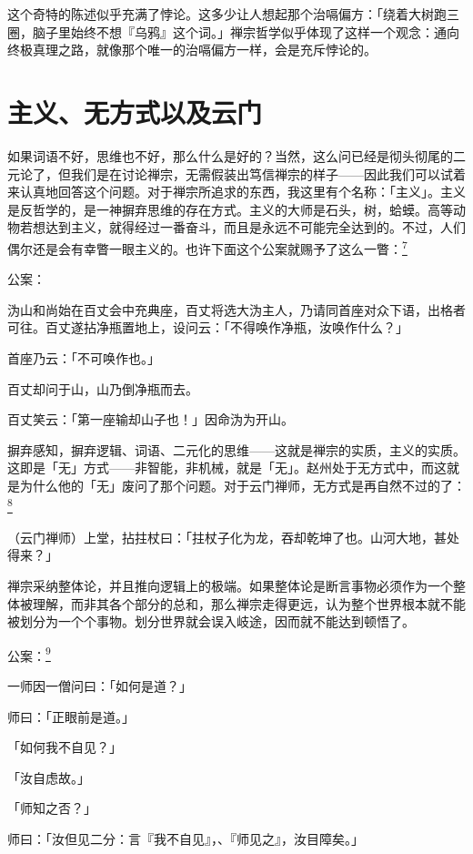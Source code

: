 \documentclass[
  12pt,
  twoside,
  openright,
  oldfontcommands,
]{memoir}
\begin{document}
这个奇特的陈述似乎充满了悖论。这多少让人想起那个治嗝偏方：「绕着大树跑三圈，脑子里始终不想『乌鸦』这个词。」禅宗哲学似乎体现了这样一个观念：通向终极真理之路，就像那个唯一的治嗝偏方一样，会是充斥悖论的。

\section{主义、无方式以及云门}

如果词语不好，思维也不好，那么什么是好的？当然，这么问已经是彻头彻尾的二元论了，但我们是在讨论禅宗，无需假装出笃信禅宗的样子------因此我们可以试着来认真地回答这个问题。对于禅宗所追求的东西，我这里有个名称：「主义」。主义是反哲学的，是一神摒弃思维的存在方式。主义的大师是石头，树，蛤蟆。高等动物若想达到主义，就得经过一番奋斗，而且是永远不可能完全达到的。不过，人们偶尔还是会有幸瞥一眼主义的。也许下面这个公案就赐予了这么一瞥：\hyperref[fn:Chapter09-7]{\textsuperscript{7}}

公案：

沩山和尚始在百丈会中充典座，百丈将选大沩主人，乃请同首座对众下语，出格者可往。百丈遂拈净瓶置地上，设问云：「不得唤作净瓶，汝唤作什么？」

首座乃云：「不可唤作也。」

百丈却问于山，山乃倒净瓶而去。

百丈笑云：「第一座输却山子也！」因命沩为开山。

摒弃感知，摒弃逻辑、词语、二元化的思维------这就是禅宗的实质，主义的实质。这即是「无」方式------非智能，非机械，就是「无」。赵州处于无方式中，而这就是为什么他的「无」废问了那个问题。对于云门禅师，无方式是再自然不过的了：\hyperref[fn:Chapter09-8]{\textsuperscript{8}}

{（云门禅师）}上堂，拈拄杖曰：「拄杖子化为龙，吞却乾坤了也。山河大地，甚处得来？」

禅宗采纳整体论，并且推向逻辑上的极端。如果整体论是断言事物必须作为一个整体被理解，而非其各个部分的总和，那么禅宗走得更远，认为整个世界根本就不能被划分为一个个事物。划分世界就会误入岐途，因而就不能达到顿悟了。

公案：\hyperref[fn:Chapter09-9]{\textsuperscript{9}}

一师因一僧问曰：「如何是道？」

师曰：「正眼前是道。」

「如何我不自见？」

「汝自虑故。」

「师知之否？」

师曰：「汝但见二分：言『我不自见』，、『师见之』，汝目障矣。」
\end{document}
